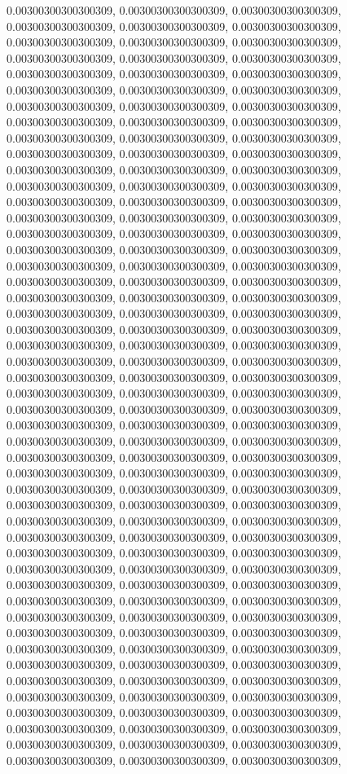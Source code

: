 \documentclass[
  ,man]{apa6}
\begin{document}
0.00300300300300309, 0.00300300300300309, 0.00300300300300309, 0.00300300300300309, 0.00300300300300309, 0.00300300300300309, 0.00300300300300309, 0.00300300300300309, 0.00300300300300309, 0.00300300300300309, 0.00300300300300309, 0.00300300300300309, 0.00300300300300309, 0.00300300300300309, 0.00300300300300309, 0.00300300300300309, 0.00300300300300309, 0.00300300300300309, 0.00300300300300309, 0.00300300300300309, 0.00300300300300309, 0.00300300300300309, 0.00300300300300309, 0.00300300300300309,
0.00300300300300309, 0.00300300300300309, 0.00300300300300309, 0.00300300300300309, 0.00300300300300309, 0.00300300300300309, 0.00300300300300309, 0.00300300300300309, 0.00300300300300309, 0.00300300300300309, 0.00300300300300309, 0.00300300300300309, 0.00300300300300309, 0.00300300300300309, 0.00300300300300309, 0.00300300300300309, 0.00300300300300309, 0.00300300300300309, 0.00300300300300309, 0.00300300300300309, 0.00300300300300309, 0.00300300300300309, 0.00300300300300309, 0.00300300300300309,
0.00300300300300309, 0.00300300300300309, 0.00300300300300309, 0.00300300300300309, 0.00300300300300309, 0.00300300300300309, 0.00300300300300309, 0.00300300300300309, 0.00300300300300309, 0.00300300300300309, 0.00300300300300309, 0.00300300300300309, 0.00300300300300309, 0.00300300300300309, 0.00300300300300309, 0.00300300300300309, 0.00300300300300309, 0.00300300300300309, 0.00300300300300309, 0.00300300300300309, 0.00300300300300309, 0.00300300300300309, 0.00300300300300309, 0.00300300300300309,
0.00300300300300309, 0.00300300300300309, 0.00300300300300309, 0.00300300300300309, 0.00300300300300309, 0.00300300300300309, 0.00300300300300309, 0.00300300300300309, 0.00300300300300309, 0.00300300300300309, 0.00300300300300309, 0.00300300300300309, 0.00300300300300309, 0.00300300300300309, 0.00300300300300309, 0.00300300300300309, 0.00300300300300309, 0.00300300300300309, 0.00300300300300309, 0.00300300300300309, 0.00300300300300309, 0.00300300300300309, 0.00300300300300309, 0.00300300300300309,
0.00300300300300309, 0.00300300300300309, 0.00300300300300309, 0.00300300300300309, 0.00300300300300309, 0.00300300300300309, 0.00300300300300309, 0.00300300300300309, 0.00300300300300309, 0.00300300300300309, 0.00300300300300309, 0.00300300300300309, 0.00300300300300309, 0.00300300300300309, 0.00300300300300309, 0.00300300300300309, 0.00300300300300309, 0.00300300300300309, 0.00300300300300309, 0.00300300300300309, 0.00300300300300309, 0.00300300300300309, 0.00300300300300309, 0.00300300300300309,
0.00300300300300309, 0.00300300300300309, 0.00300300300300309, 0.00300300300300309, 0.00300300300300309, 0.00300300300300309, 0.00300300300300309, 0.00300300300300309, 0.00300300300300309, 0.00300300300300309, 0.00300300300300309, 0.00300300300300309, 0.00300300300300309, 0.00300300300300309, 0.00300300300300309, 0.00300300300300309, 0.00300300300300309, 0.00300300300300309, 0.00300300300300309, 0.00300300300300309, 0.00300300300300309, 0.00300300300300309, 0.00300300300300309, 0.00300300300300309,
\end{document}

